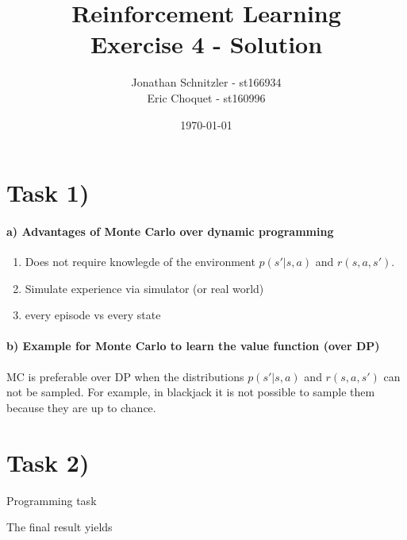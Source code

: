 \documentclass{article}
\title{Reinforcement Learning \\ Exercise 4 - Solution}
\author{Jonathan Schnitzler - st166934 \\
Eric Choquet - st160996}
\date{\today}
\begin{document}
\maketitle
\section*{Task 1)}


\paragraph*{a) Advantages of Monte Carlo over dynamic programming}

\begin{enumerate}
    \item Does not require knowlegde of the environment $p(s'| s,a)$ and $r(s,a,s')$.
    \item Simulate experience via simulator (or real world)
    \item every episode vs every state
\end{enumerate}

\paragraph*{b) Example for Monte Carlo to learn the value function (over DP)}

MC is preferable over DP when the distributions $p(s'|s, a)$ and $r(s,a,s')$ can not be sampled. For example, in blackjack it is not possible to sample them because they are up to chance.



\section*{Task 2)}

Programming task

The final result yields 
\end{document}

